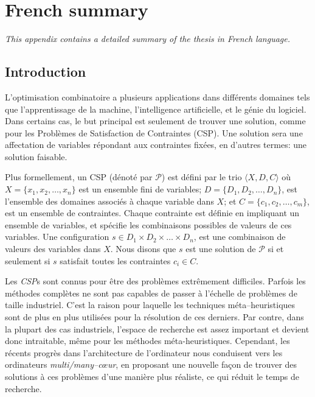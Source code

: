 \chapter{French summary}
\label{app:res_franc}
\textit{This appendix contains a detailed summary of the thesis in French language.}
\vfill
\minitoc
\newpage

\section{Introduction}

L'optimisation combinatoire a plusieurs applications dans diff\'erents domaines tels que l'apprentissage de la machine, l'intelligence artificielle, et le g\'enie du logiciel. Dans certains cas, le but principal est seulement de trouver une solution, comme pour les Probl\`emes de Satisfaction de Contraintes (CSP). Une solution sera une affectation de variables r\'epondant aux contraintes fix\'ees, en d'autres termes: une solution faisable.

Plus formellement, un CSP (d\'enot\'e par $\mathcal{P}$) est d\'efini par le trio $\langle X,D,C \rangle$  o\`u $X = \{x_1, x_2,\dots,x_n\}$ est un ensemble fini de variables; $D = \{D_1, D_2,\dots, D_n\}$, est l'ensemble des domaines associ\'es \`a chaque variable dans $X$; et $C = \{c_1, c_2,\dots,c_m\}$, est un ensemble de contraintes. Chaque contrainte est d\'efinie en impliquant un ensemble de variables, et sp\'ecifie les combinaisons possibles de valeurs de ces variables. Une configuration $s\in D_1\times D_2\times\dots\times D_n$, est une combinaison de valeurs des variables dans $X$. Nous disons que $s$ est une solution de $\mathcal{P}$ si et seulement si $s$ satisfait toutes les contraintes $c_i \in C$.

Les {\it CSP}s sont connus pour \^etre des probl\`emes extr\^emement difficiles. Parfois les m\'ethodes compl\`etes ne sont pas capables de passer \`a l'\'echelle de probl\`emes de taille industriel. C'est la raison  pour laquelle les techniques m\'eta--heuristiques sont de plus en plus utilis\'ees pour la r\'esolution de ces derniers. Par contre, dans la plupart des cas industriels, l'espace de recherche est assez important et devient donc intraitable, m\^eme pour les m\'ethodes m\'eta-heuristiques. Cependant, les r\'ecents progr\`es dans l'architecture de l'ordinateur nous conduisent vers les ordinateurs {\it multi/many--c\oe ur}, en proposant une nouvelle fa\c{c}on de trouver des solutions \`a ces probl\`emes d'une mani\`ere plus r\'ealiste, ce qui r\'eduit le temps de recherche.

